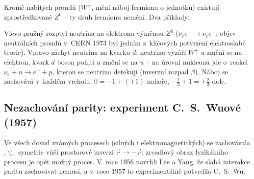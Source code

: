 Kromě nabitých proudů ($W^\pm$, mění náboj fermionu o jednotku) existují  zprostředkované $Z^0$ -- ty druh fermionu nemění. Dva příklady:
\begin{center}
\end{center}
Vlevo pružný rozptyl neutrina na elektronu výměnou $Z^0$ ($\nu_e e^-\to\nu_e e^-$; objev neutrálních proudů v~CERN 1973 byl jedním z~klíčových potvrzení elektroslabé teorie). Vpravo záchyt neutrina na kvarku $d$: neutrino vyzáří $W^+$ a změní se na elektron, kvark $d$ boson pohltí a změní se na $u$ -- na úrovni nukleonů jde o~reakci $\nu_e + n\to e^- + p$, kterou se neutrina detekují (inverzní rozpad $\beta$). Náboj se zachovává v~každém vrcholu: $0 = -1 + (+1)$ nahoře, $-\tfrac13 + 1 = +\tfrac23$ dole.

\subsection{Nezachování parity: experiment C.~S.~Wuové (1957)}

Ve všech dosud známých procesech (silných i elektromagnetických) se zachovávala , tj.\ symetrie vůči prostorové inverzi $\vec r\to-\vec r$: zrcadlový obraz fyzikálního procesu je opět možný proces. V~roce 1956 navrhli Lee a Yang, že slabá interakce paritu zachovávat nemusí, a v~roce 1957 to experimentálně potvrdila C.~S.~Wu.

